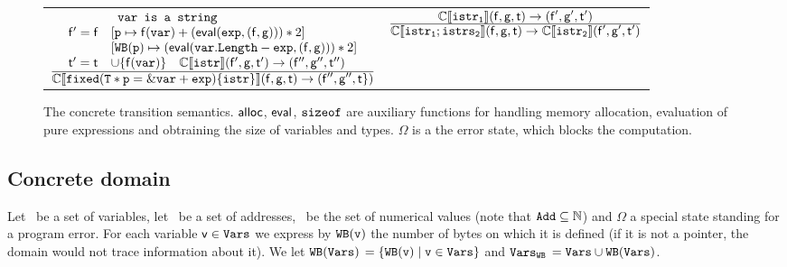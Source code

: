 \documentclass[10pt]{sigplanconf}
\begin{document}
\begin{figure}[t]
\begin{tabular}{@{}c@{}c@{}}
$
\frac{\displaystyle 
\begin{array}{c}
\begin{array}{ll}
& \texttt{ var is a string}\\
\mathsf{f'}=\mathsf{f} & [\mathtt{p} \mapsto \mathsf{f}(\mathtt{var})+(\mathsf{eval}(\mathtt{exp},(\mathsf{f},\mathsf{g})))*2]\\
      & [\mathtt{WB}(\mathtt{\mathtt{p}}) \mapsto (\mathsf{eval}(\mathtt{\mathtt{var.Length}-\mathtt{exp}},(\mathsf{f},\mathsf{g})))*2] \\
      \mathsf{t'} = \mathsf{t} & \cup \{ \mathsf{f}(\mathtt{var}) \} \quad \mathbb{C}\llbracket \mathtt{istr} \rrbracket(\mathsf{f}', \mathsf{g}, \mathsf{t}')   \rightarrow (\mathsf{f''}, \mathsf{g''}, \mathsf{t''} )\\
\end{array}\\
\end{array}
}{\displaystyle \mathbb{C}\llbracket \mathtt{\mathtt{fixed(T* p = \&var+exp) \{ istr \}}} \rrbracket(\mathsf{f},\mathsf{g},\mathsf{t}) \rightarrow(\mathsf{f''}, \mathsf{g''},\mathsf{t} \})}
$
&
$
  \frac{\displaystyle 
    \mathbb{C}\llbracket \mathtt{\mathtt{istr_1}} \rrbracket(\mathsf{f}, \mathsf{g}, \mathsf{t}) \rightarrow (\mathsf{f}', \mathsf{g}', \mathsf{t}') 
  }{\displaystyle 
    \mathbb{C}\llbracket \mathtt{\mathtt{istr_1}; \mathtt{istrs_2}} \rrbracket(\mathsf{f}, \mathsf{g}, \mathsf{t}) \rightarrow \mathbb{C}\llbracket \mathtt{\mathtt{istr_2}} \rrbracket(\mathsf{f}', \mathsf{g}', \mathsf{t}')
  }  
$
\end{tabular}
\normalsize
\caption{The concrete transition semantics. $\mathsf{alloc}$, $\mathsf{eval}$, $\mathtt{sizeof}$ are auxiliary functions for handling memory allocation, evaluation of pure expressions and obtraining the size of variables and types. $\Omega$ is a the error state, which blocks the computation. }
\label{fig:ConcreteSmallStepSemantics}
\end{figure}

\subsection{Concrete domain}
Let \variables\ be a  set of variables, let \addresses\ be a set of addresses, \naturalnumbers\ be the set of numerical values (note that $\mathtt{Add} \subseteq \mathbb{N}$) and $\Omega$ a special state standing for a program error. 
For each variable $\mathtt{\mathsf{v}} \in \mathtt{Vars}$ we express by $\mathtt{WB}(\mathtt{\mathtt{v}})$ the number of bytes on which it is defined (if it is not a pointer, the domain would not trace information about it).  
We let $\mathtt{WB}(\mathtt{\mathtt{Vars}})$  $ = \{ \mathtt{WB}(\mathtt{v}) \mid \mathtt{v} \in \mathtt{Vars}  \}$ and 
$\mathtt{Vars}_{\mathtt{WB}}$  $ =\mathtt{Vars} \cup \mathtt{WB}(\mathtt{\mathtt{Vars}})$.
\end{document}
